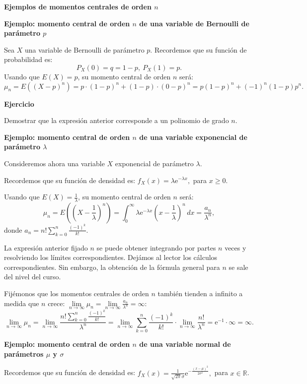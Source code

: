 \documentclass[
  letterpaper,
  DIV=11,
  numbers=noendperiod]{scrreprt}
\begin{document}
\textbf{Ejemplos de momentos centrales de orden \(n\)}

\textbf{Ejemplo: momento central de orden \(n\) de una variable de
Bernoulli de parámetro \(p\)}

Sea \(X\) una variable de Bernoulli de parámetro \(p\). Recordemos que
su función de probabilidad es: \[
P_X(0)=q=1-p,\ P_X(1)=p.
\] Usando que \(E(X)=p\), su momento central de orden \(n\) será: \[
\mu_n = E\left((X-p)^n\right)=p\cdot (1-p)^n+(1-p)\cdot (0-p)^n = p(1-p)^n + (-1)^n (1-p) p^n.
\]

\textbf{Ejercicio}

Demostrar que la expresión anterior corresponde a un polinomio de grado
\(n\).

\textbf{Ejemplo: momento central de orden \(n\) de una variable
exponencial de parámetro \(\lambda\)}

Consideremos ahora una variable \(X\) exponencial de parámetro
\(\lambda\).

Recordemos que su función de densidad es:
\(f_X(x)=\lambda \mathrm{e}^{-\lambda x},\) para \(x\geq 0\).

Usando que \(E(X)=\frac{1}{\lambda}\), su momento central de orden \(n\)
será: \[
\mu_n = E\left(\left(X-\frac{1}{\lambda}\right)^n\right)=\int_0^\infty \lambda \mathrm{e}^{-\lambda x} \left(x-\frac{1}{\lambda}\right)^n\, dx =\frac{a_n}{\lambda^n},
\] donde \(a_n = n!\sum\limits_{k=0}^n \frac{(-1)^k}{k!}.\)

La expresión anterior fijado \(n\) se puede obtener integrando por
partes \(n\) veces y resolviendo los límites correspondientes. Dejámos
al lector los cálculos correspondientes. Sin embargo, la obtención de la
fórmula general para \(n\) se sale del nivel del curso.

Fijémonos que los momentos centrales de orden \(n\) también tienden a
infinito a medida que \(n\) crece:
\(\lim\limits_{n\to\infty}\mu_n = \lim\limits_{n\to\infty}\frac{a_n}{\lambda^n}=\infty\):
\[
\lim_{n\to\infty}\mu_n =\lim_{n\to\infty} \frac{n!\sum\limits_{k=0}^n \frac{(-1)^k}{k!}}{\lambda^n}= 
\lim_{n\to\infty}\sum\limits_{k=0}^n \frac{(-1)^k}{k!}\cdot \lim_{n\to\infty} \frac{n!}{\lambda^n}= \mathrm{e}^{-1}\cdot \infty = \infty.
\]

\textbf{Ejemplo: momento central de orden \(n\) de una variable normal
de parámetros \(\mu\) y \(\sigma\)}

Recordemos que su función de densidad es:
\(f_X(x)=\frac{1}{\sqrt{2\pi}\sigma}\mathrm{e}^{-\frac{(x-\mu)^2}{2\sigma^2}},\)
para \(x\in \mathbb{R}\).
\end{document}
